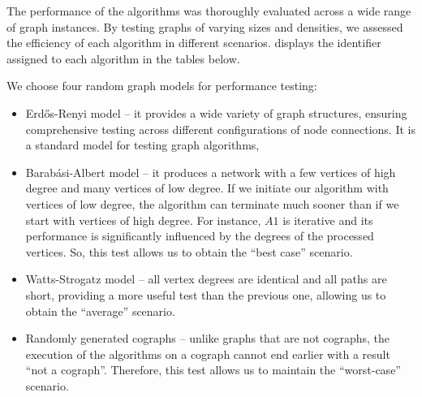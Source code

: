 The performance of the algorithms was thoroughly evaluated across a wide range of graph instances. By testing graphs of varying sizes and densities, we assessed the efficiency of each algorithm in different scenarios.   displays the identifier assigned to each algorithm in the tables below.

We choose four random graph models for performance testing:
\begin{itemize}
    \item Erd\H{o}s-Renyi model --  it provides a wide variety of graph structures, ensuring comprehensive testing across different configurations of node connections. It is a standard model for testing graph algorithms,
    \item Barab\'asi-Albert model -- it produces a network with a few vertices of high degree and many vertices of low degree. If we initiate our algorithm with vertices of low degree, the algorithm can terminate much sooner than if we start with vertices of high degree. For instance, $A1$ is iterative and its performance is significantly influenced by the degrees of the processed vertices. So, this test allows us to obtain the ``best case'' scenario.
    \item Watts-Strogatz model -- all vertex degrees are identical and all paths are short, providing a more useful test than the previous one, allowing us to obtain the ``average'' scenario.
    \item Randomly generated cographs -- unlike graphs that are not cographs, the execution of the algorithms on a cograph cannot end earlier with a result ``not a cograph''. Therefore, this test allows us to maintain the ``worst-case'' scenario. 
\end{itemize}

